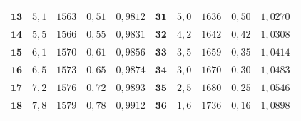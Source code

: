 \documentclass[11pt,a4paper]{article}
\begin{document}
\begin{table}[h!]
\begin{center}
\begin{tabular}{|c|c|c|c|c|c|c|c|c|c|}
$\textbf{13}$ & $5,1$ &	$1563$ & $0,51$ & $0,9812$ & $\textbf{31}$ & $5,0$ & $1636$ & $0,50$ & $1,0270$\\ \hline
$\textbf{14}$ & $5,5$ &	$1566$ & $0,55$ & $0,9831$ & $\textbf{32}$ & $4,2$ & $1642$ & $0,42$ & $1,0308$\\ \hline
$\textbf{15}$ & $6,1$ &	$1570$ & $0,61$ & $0,9856$ & $\textbf{33}$ & $3,5$ & $1659$ & $0,35$ & $1,0414$ \\ \hline
$\textbf{16}$ & $6,5$ &	$1573$ & $0,65$ & $0,9874$ & $\textbf{34}$ & $3,0$ & $1670$ & $0,30$ & $1,0483$\\ \hline
$\textbf{17}$ & $7,2$ &	$1576$ & $0,72$ & $0,9893$ & $\textbf{35}$ & $2,5$ & $1680$ & $0,25$ & $1,0546$\\ \hline
$\textbf{18}$ & $7,8$ &	$1579$ & $0,78$ & $0,9912$ & $\textbf{36}$ & $1,6$ & $1736$ & $0,16$ & $1,0898$\\ \hline
\end{tabular}
\end{center}
\end{table}
\end{document}
